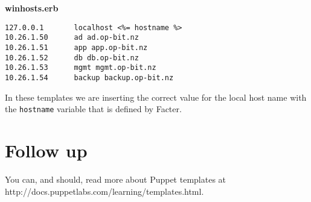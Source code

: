 \documentclass{article}   	%
\begin{document}
\textbf{winhosts.erb}
\begin{verbatim}
127.0.0.1       localhost <%= hostname %>
10.26.1.50      ad ad.op-bit.nz
10.26.1.51      app app.op-bit.nz
10.26.1.52      db db.op-bit.nz
10.26.1.53      mgmt mgmt.op-bit.nz
10.26.1.54      backup backup.op-bit.nz

\end{verbatim}

In these templates we are inserting the correct value for the local host name with the \texttt{hostname} variable that is defined by Facter.


\section{Follow up}
You can, and should, read more about Puppet templates at http://docs.puppetlabs.com/learning/templates.html.
\end{document}

